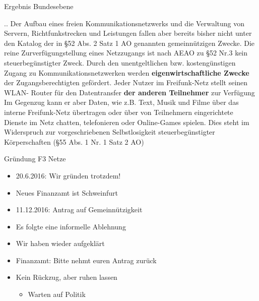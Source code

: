 \begin{frame}{Ergebnis Bundesebene}
    \begin{block}{..}
        \small
        Der Aufbau eines freien Kommunikationsnetzwerks und die Verwaltung von Servern,
        Richtfunkstrecken und Leistungen fallen aber bereits bisher nicht unter den Katalog der
        in §52 Abs. 2 Satz 1 AO genannten gemeinnützigen Zwecke. Die reine
        Zurverfügungstellung eines Netzzugangs ist nach AEAO zu §52 Nr.3 kein
        steuerbegünstigter Zweck. Durch den unentgeltlichen bzw. kostengünstigen Zugang zu
        Kommunikationsnetzwerken werden {\bf{}eigenwirtschaftliche Zwecke} der
        Zugangsberechtigten gefördert. Jeder Nutzer im Freifunk-Netz stellt seinen WLAN-
        Router für den Datentransfer {\bf{}der anderen Teilnehmer} zur Verfügung Im Gegenzug kann
        er aber Daten, wie z.B. Text, Musik und Filme über das interne Freifunk-Netz
        übertragen oder über von Teilnehmern eingerichtete Dienste im Netz chatten,
        telefonieren oder Online-Games spielen. Dies steht im Widerspruch zur
        vorgeschriebenen Selbstlosigkeit steuerbegünstigter Körperschaften (§55 Abs. 1 Nr. 1
        Satz 2 AO)
    \end{block}
\end{frame}

\begin{frame}{Gründung F3 Netze}
    \begin{itemize}
        \item 20.6.2016: Wir gründen trotzdem!
        \item Neues Finanzamt ist Schweinfurt
        \item 11.12.2016: Antrag auf Gemeinnützigkeit
        \item Es folgte eine informelle Ablehnung
        \item Wir haben wieder aufgeklärt
        \item Finanzamt: Bitte nehmt euren Antrag zurück
        \item Kein Rückzug, aber ruhen lassen
        \begin{itemize}
            \item Warten auf Politik
        \end{itemize}
    \end{itemize}
\end{frame}

